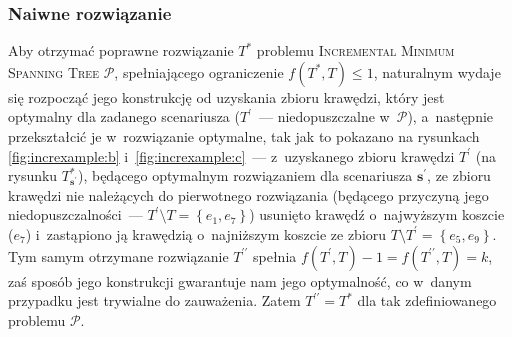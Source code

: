 \subsubsection{Naiwne rozwiązanie}


Aby otrzymać poprawne rozwiązanie $T^{\ast}$ problemu \textsc{Incremental Minimum Spanning Tree} $\mathcal{P}$, spełniającego ograniczenie $f \left( T^{\ast}, T \right) \leqslant 1$, naturalnym wydaje się rozpocząć jego konstrukcję od uzyskania zbioru krawędzi, który jest optymalny dla zadanego scenariusza ($T^{\prime}$~--- niedopuszczalne w~$\mathcal{P}$), a~następnie przekształcić je w~rozwiązanie optymalne, tak jak to pokazano na rysunkach \ref{fig:increxample:b} i~\ref{fig:increxample:c}~--- z~uzyskanego zbioru krawędzi $T^{\prime}$ (na rysunku $T^{\ast}_{\textbf{s}^{\prime}}$), będącego optymalnym rozwiązaniem dla scenariusza $\textbf{s}^{\prime}$, ze zbioru krawędzi nie należących do pierwotnego rozwiązania (będącego przyczyną jego niedopuszczalności~--- $T^{\prime} \setminus T = \left\{ e_{1}, e_{7} \right\}$) usunięto krawędź o~najwyższym koszcie ($e_{7}$) i~zastąpiono ją krawędzią o~najniższym koszcie ze zbioru $T \setminus T^{\prime} = \left\{ e_{5}, e_{9} \right\}$.
Tym samym otrzymane rozwiązanie $T^{\prime\prime}$ spełnia $f \left( T^{\prime}, T \right) - 1 = f \left( T^{\prime\prime}, T \right) = k$, zaś sposób jego konstrukcji gwarantuje nam jego optymalność, co w~danym przypadku jest trywialne do zauważenia.
Zatem $T^{\prime\prime} = T^{\ast}$ dla tak zdefiniowanego problemu $\mathcal{P}$.

